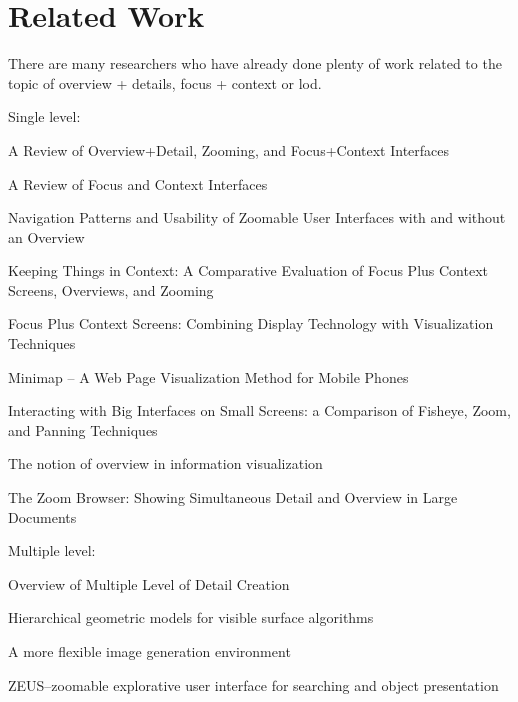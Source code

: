 \section{Related Work}

There are many researchers who have already done plenty of work related to the topic of overview + details, focus + context or \gls{lod}.


Single level:

A Review of Overview+Detail, Zooming, and Focus+Context Interfaces\cite{cockburn2009review}

A Review of Focus and Context Interfaces\cite{cockburn2006review}

Navigation Patterns and Usability of Zoomable User Interfaces with and without an Overview\cite{hornbaek2002navigation}

Keeping Things in Context: A Comparative Evaluation of Focus Plus Context Screens, Overviews, and Zooming\cite{baudisch2002keeping}

Focus Plus Context Screens: Combining Display Technology with Visualization Techniques\cite{baudisch2001focus}

Minimap – A Web Page Visualization Method for Mobile Phones\cite{roto2006minimap}

Interacting with Big Interfaces on Small Screens: a Comparison of Fisheye, Zoom, and Panning Techniques\cite{gutwin2004interacting}

The notion of overview in information visualization\cite{hornbaek2011notion}

The Zoom Browser: Showing Simultaneous Detail and Overview in Large Documents\cite{holmquist1998zoom}


Multiple level:

Overview of Multiple Level of Detail Creation\cite{zhigeng1998overview}

Hierarchical geometric models for visible surface algorithms\cite{clark1976hierarchical}

A more flexible image generation environment\cite{crow1982more}

ZEUS–zoomable explorative user interface for searching and object presentation\cite{gundelsweiler2007zeus}
